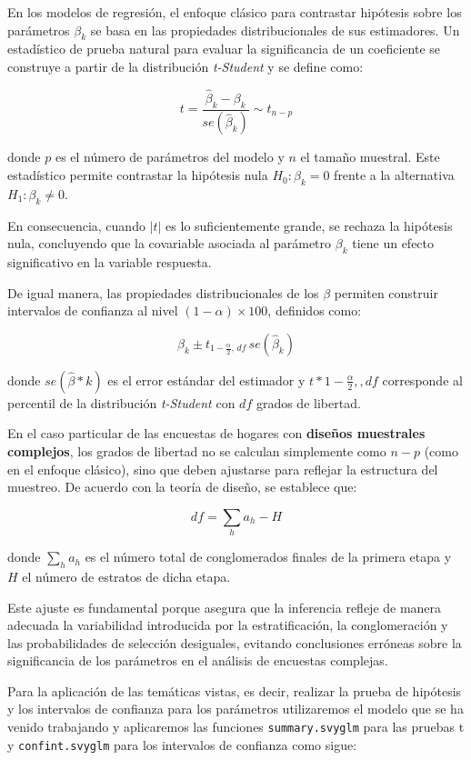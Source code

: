 \documentclass[
  12pt,
]{book}
\begin{document}
En los modelos de regresión, el enfoque clásico para contrastar hipótesis sobre los parámetros \(\beta_k\) se basa en las propiedades distribucionales de sus estimadores. Un estadístico de prueba natural para evaluar la significancia de un coeficiente se construye a partir de la distribución \emph{t-Student} y se define como:

\[
t=\frac{\hat{\beta}_{k}-\beta_{k}}{se\left(\hat{\beta}_{k}\right)} \sim t_{n-p}
\]

donde \(p\) es el número de parámetros del modelo y \(n\) el tamaño muestral. Este estadístico permite contrastar la hipótesis nula \(H_{0}:\beta_{k}=0\) frente a la alternativa \(H_{1}:\beta_{k}\neq 0\).

En consecuencia, cuando \(|t|\) es lo suficientemente grande, se rechaza la hipótesis nula, concluyendo que la covariable asociada al parámetro \(\beta_k\) tiene un efecto significativo en la variable respuesta.

De igual manera, las propiedades distribucionales de los \(\beta\) permiten construir intervalos de confianza al nivel \((1-\alpha)\times100%
\), definidos como:

\[
\hat{\beta}_{k}\pm t_{1-\frac{\alpha}{2},\,df}\,se\left(\hat{\beta}_{k}\right)
\]

donde \(se(\hat{\beta}*k)\) es el error estándar del estimador y \(t*{1-\frac{\alpha}{2},,df}\) corresponde al percentil de la distribución \emph{t-Student} con \(df\) grados de libertad.

En el caso particular de las encuestas de hogares con \textbf{diseños muestrales complejos}, los grados de libertad no se calculan simplemente como \(n-p\) (como en el enfoque clásico), sino que deben ajustarse para reflejar la estructura del muestreo. De acuerdo con la teoría de diseño, se establece que:

\[
df = \sum_{h} a_{h} - H
\]

donde \(\sum_{h}a_{h}\) es el número total de conglomerados finales de la primera etapa y \(H\) el número de estratos de dicha etapa.

Este ajuste es fundamental porque asegura que la inferencia refleje de manera adecuada la variabilidad introducida por la estratificación, la conglomeración y las probabilidades de selección desiguales, evitando conclusiones erróneas sobre la significancia de los parámetros en el análisis de encuestas complejas.

Para la aplicación de las temáticas vistas, es decir, realizar la prueba de hipótesis y los intervalos de confianza para los parámetros utilizaremos el modelo que se ha venido trabajando y aplicaremos las funciones \texttt{summary.svyglm} para las pruebas t y \texttt{confint.svyglm} para los intervalos de confianza como sigue:
\end{document}
